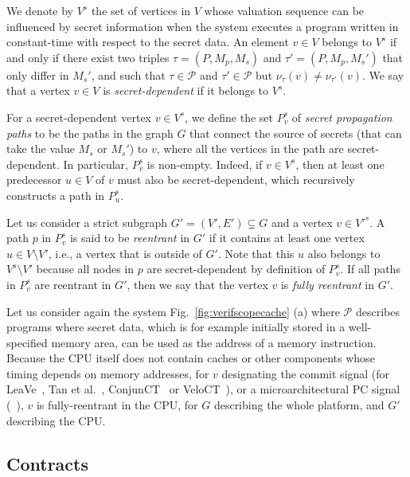 We denote by $V^s$ the set of vertices in $V$ whose valuation sequence can be influenced by secret information when the system executes a program written in constant-time with respect to the secret data.
An element $v \in V$ belongs to $V^s$ if and only if there exist two triples $\tau = (P, M_p, M_s)$ and $\tau' = (P, M_p, M_s')$ that only differ in $M_s'$, and such that $\tau \in \mathcal{P}$ and $\tau' \in \mathcal{P}$ but $\nu_\tau(v) \neq \nu_{\tau'}(v)$.
We say that a vertex $v \in V$ is \emph{secret-dependent} if it belongs to $V^s$.

For a secret-dependent vertex $v \in V^s$, we define the set $P^s_v$ of \emph{secret propagation paths} to be the paths in the graph $G$ that connect the source of secrets (that can take the value $M_s$ or $M_s'$) to $v$, where all the vertices in the path are secret-dependent.
In particular, $P^s_v$ is non-empty.
Indeed, if $v \in V^s$, then at least one predecessor $u \in V$ of $v$ must also be secret-dependent, which recursively constructs a path in $P^s_u$.

Let us consider a strict subgraph $G' = (V', E') \subsetneq G$ and a vertex $v \in V'^s$.
A path $p$ in $P^s_v$ is said to be \emph{reentrant} in $G'$ if it contains at least one vertex $u \in V \setminus V'$, i.e., a vertex that is outside of $G'$.
Note that this $u$ also belongs to $V^s\setminus V'$ because all nodes in $p$ are secret-dependent by definition of $P^s_v$.
If all paths in $P^s_v$ are reentrant in $G'$, then we say that the vertex $v$ is \emph{fully reentrant} in $G'$.

Let us consider again the system Fig.~\ref{fig:verifscopecache} (a) where $\mathcal{P}$ describes programs where secret data, which is for example initially stored in a well-specified memory area, can be used as the address of a memory instruction.
Because the CPU itself does not contain caches or other components whose timing depends on memory addresses, for $v$ designating the commit signal (for LeaVe~\cite{wang2023specification}, Tan et al.~\cite{tan2025contractshadowlogic}, ConjunCT~\cite{dinesh2024conjunct} or VeloCT~\cite{dinesh2025h}), or a microarchitectural PC signal (\ucfi~\cite{ceesay2024mucfi}), $v$ is fully-reentrant in the CPU, for $G$ describing the whole platform, and $G'$ describing the CPU.

\subsection{Contracts}

